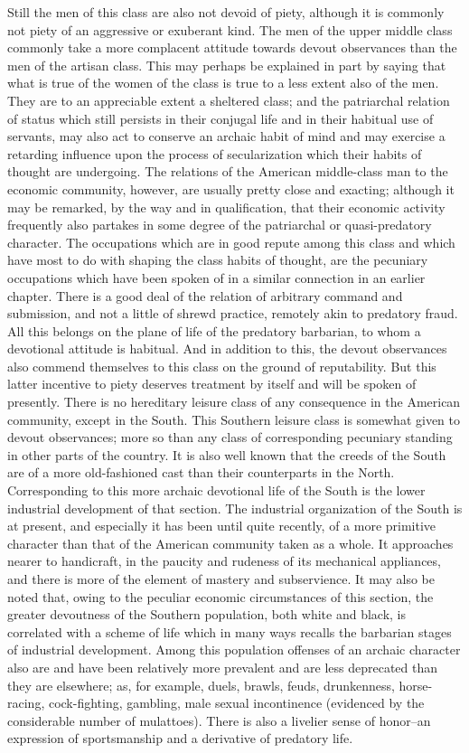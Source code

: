 \documentclass[12pt]{report}
\begin{document}
Still the men of this class are also not devoid of piety, although it
is commonly not piety of an aggressive or exuberant kind. The men of
the upper middle class commonly take a more complacent attitude towards
devout observances than the men of the artisan class. This may perhaps
be explained in part by saying that what is true of the women of
the class is true to a less extent also of the men. They are to an
appreciable extent a sheltered class; and the patriarchal relation of
status which still persists in their conjugal life and in their habitual
use of servants, may also act to conserve an archaic habit of mind and
may exercise a retarding influence upon the process of secularization
which their habits of thought are undergoing. The relations of the
American middle-class man to the economic community, however, are
usually pretty close and exacting; although it may be remarked, by the
way and in qualification, that their economic activity frequently also
partakes in some degree of the patriarchal or quasi-predatory character.
The occupations which are in good repute among this class and which have
most to do with shaping the class habits of thought, are the pecuniary
occupations which have been spoken of in a similar connection in an
earlier chapter. There is a good deal of the relation of arbitrary
command and submission, and not a little of shrewd practice, remotely
akin to predatory fraud. All this belongs on the plane of life of the
predatory barbarian, to whom a devotional attitude is habitual. And in
addition to this, the devout observances also commend themselves to this
class on the ground of reputability. But this latter incentive to piety
deserves treatment by itself and will be spoken of presently. There
is no hereditary leisure class of any consequence in the American
community, except in the South. This Southern leisure class is somewhat
given to devout observances; more so than any class of corresponding
pecuniary standing in other parts of the country. It is also well known
that the creeds of the South are of a more old-fashioned cast than their
counterparts in the North. Corresponding to this more archaic devotional
life of the South is the lower industrial development of that section.
The industrial organization of the South is at present, and especially
it has been until quite recently, of a more primitive character than
that of the American community taken as a whole. It approaches nearer
to handicraft, in the paucity and rudeness of its mechanical appliances,
and there is more of the element of mastery and subservience. It may
also be noted that, owing to the peculiar economic circumstances of this
section, the greater devoutness of the Southern population, both white
and black, is correlated with a scheme of life which in many ways
recalls the barbarian stages of industrial development. Among this
population offenses of an archaic character also are and have been
relatively more prevalent and are less deprecated than they are
elsewhere; as, for example, duels, brawls, feuds, drunkenness,
horse-racing, cock-fighting, gambling, male sexual incontinence
(evidenced by the considerable number of mulattoes). There is also a
livelier sense of honor--an expression of sportsmanship and a derivative
of predatory life.
\end{document}
